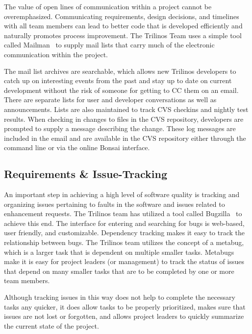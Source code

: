 \documentclass[12pt,relax]{article}
\begin{document}
The value of open lines of communication within a project cannot be 
overemphasized.  Communicating requirements, design decisions, and timelines 
with all team members can lead to better code that is developed efficiently
and naturally promotes process improvement.  The Trilinos Team uses a simple 
tool called Mailman~\cite{Mailman} to supply mail lists that carry much 
of the electronic communication within the project.

The mail list archives are searchable, which allows new Trilinos developers 
to catch up on interesting events from the past and stay up to date on current
development without the risk of someone for getting to CC them on an email.  
There are separate lists for user and developer conversations as well as
announcements.  Lists are also maintained to track CVS checkins and nightly 
test results.  When checking in changes to files in the CVS repository,
developers are prompted to supply a message describing the change.  These log
messages are included in the email and are available in the CVS repository
either through the command line or via the online Bonsai interface.

\subsection{Requirements \& Issue-Tracking}


An important step in achieving a high level of software quality is tracking
and organizing issues pertaining to faults in the software and issues related
to enhancement requests.  The Trilinos team has utilized a tool called
Bugzilla~\cite{Bugzilla} to achieve this end.  The interface for entering and
searching for bugs is web-based, user friendly, and customizable.  Dependency
tracking makes it easy to track the relationship between bugs.  The Trilinos
team utilizes the concept of a metabug, which is a larger task that is
dependent on multiple smaller tasks.  Metabugs make it is easy for project
leaders (or management) to track the status of issues that depend on many
smaller tasks that are to be completed by one or more team members.  

Although tracking issues in this way does not help to complete the
necessary tasks any quicker, it does allow tasks to be properly prioritized, 
makes sure that issues are not lost or forgotten, and allows project leaders
to quickly  summarize the current state of the project.
\end{document}
